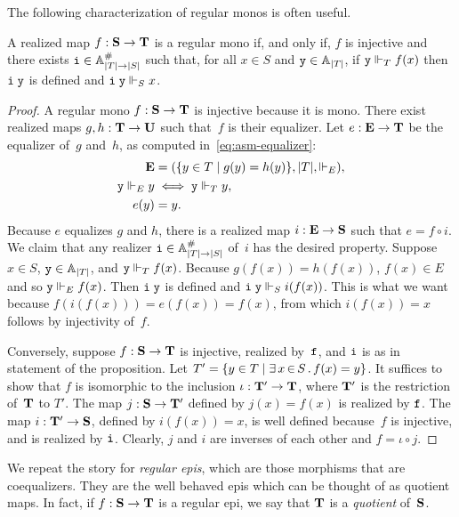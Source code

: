 The following characterization of regular monos is often useful.

\begin{proposition}
  \label{prop:reg-mono-when}%
  A realized map $f : \mathbf{S} \to \mathbf{T}$ is a regular mono if, and
  only if, $f$ is injective and there exists $\mathtt{i} \in \mathbb{A}^{\#}_{|T|
    \to |S|}$ such that, for all $x \in S$ and $\mathtt{y} \in \mathbb{A}_{|T|}$,
  if $\mathtt{y} \Vdash_T f(x)$ then $\mathtt{i}\;\mathtt{y}$ is defined and
  $\mathtt{i}\;\mathtt{y} \Vdash_S x$.
\end{proposition}

\begin{proof}
  A regular mono $f : \mathbf{S} \to \mathbf{T}$ is injective because it is
  mono. There exist realized maps $g, h : \mathbf{T} \to \mathbf{U}$ such
  that~$f$ is their equalizer. Let $e : \mathbf{E} \to \mathbf{T}$ be the
  equalizer of~$g$ and~$h$, as computed in~\eqref{eq:asm-equalizer}:
  \begin{align*}
    \mathbf{E} &= (\{y \in T \mid g(y) = h(y)\}, |T|, {\Vdash_E}), \\
    \mathtt{y} \Vdash_E y &\iff \mathtt{y} \Vdash_T y, \\
    e(y) &= y.
  \end{align*}
  Because $e$ equalizes $g$ and $h$, there is a realized map $i :
  \mathbf{E} \to \mathbf{S}$ such that $e = f \circ i$. We claim that any
  realizer $\mathtt{i} \in \mathbb{A}^{\#}_{|T| \to |S|}$ of~$i$ has the desired
  property. Suppose $x \in S$, $\mathtt{y} \in \mathbb{A}_{|T|}$, and $\mathtt{y}
  \Vdash_T f(x)$. Because $g(f(x)) = h(f(x))$, $f(x) \in E$ and so $\mathtt{y}
  \Vdash_E f(x)$. Then $\mathtt{i}\;\mathtt{y}$ is defined and $\mathtt{i}\;\mathtt{y} \Vdash_S
  i(f(x))$. This is what we want because $f(i(f(x))) = e(f(x)) =
  f(x)$, from which $i(f(x)) = x$ follows by injectivity of~$f$.

  Conversely, suppose $f : \mathbf{S} \to \mathbf{T}$ is injective, realized
  by~$\mathtt{f}$, and $\mathtt{i}$ is as in statement of the proposition. Let
  $T' = \{y \in T \mid \exists\, x \,{\in}\, S\,.\,f(x) = y\}$. It suffices to
  show that $f$ is isomorphic to the inclusion $\iota : \mathbf{T}' \to
  \mathbf{T}$, where $\mathbf{T}'$ is the restriction of~$\mathbf{T}$ to $T'$.
  The map $j : \mathbf{S} \to \mathbf{T}'$ defined by $j(x) = f(x)$ is
  realized by $\mathtt{f}$. The map $i : \mathbf{T}' \to \mathbf{S}$, defined by
  $i(f(x)) = x$, is well defined because~$f$ is injective, and is
  realized by $\mathtt{i}$. Clearly, $j$ and $i$ are inverses of each other
  and $f = \iota \circ j$.
\end{proof}


We repeat the story for \emph{regular epis}, which are those morphisms
that are coequalizers. They are the well behaved epis which can be
thought of as quotient maps. In fact, if $f : \mathbf{S} \to \mathbf{T}$ is
a regular epi, we say that $\mathbf{T}$ is a \emph{quotient} of~$\mathbf{S}$.

